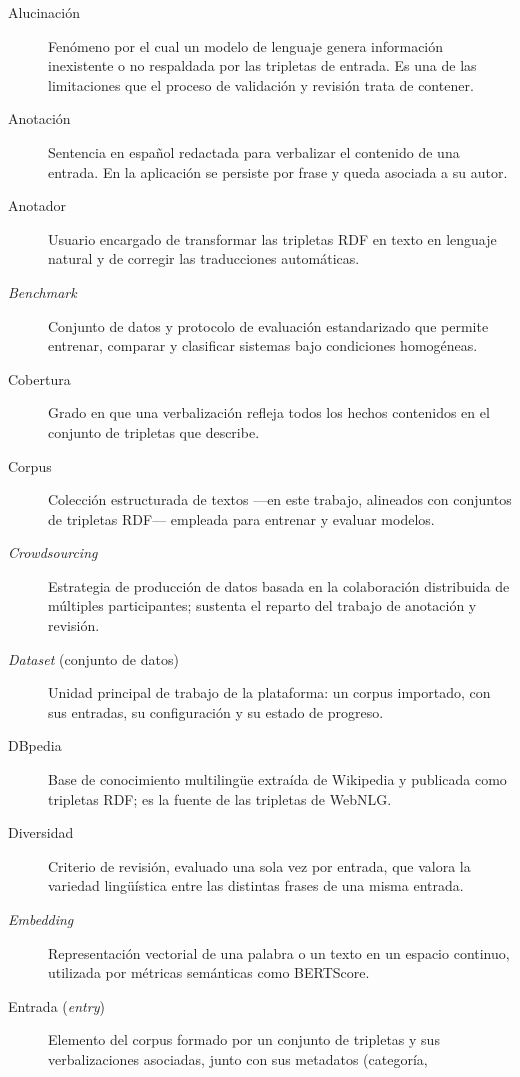 \begin{description}
	\item[Alucinación] Fenómeno por el cual un modelo de lenguaje genera información
	      inexistente o no respaldada por las tripletas de entrada. Es una de las
	      limitaciones que el proceso de validación y revisión trata de contener.
	\item[Anotación] Sentencia en español redactada para verbalizar el contenido de una
	      entrada. En la aplicación se persiste por frase y queda asociada a su autor.
	\item[Anotador] Usuario encargado de transformar las tripletas RDF en texto en
	      lenguaje natural y de corregir las traducciones automáticas.
	\item[\textit{Benchmark}] Conjunto de datos y protocolo de evaluación estandarizado
	      que permite entrenar, comparar y clasificar sistemas bajo condiciones
	      homogéneas.
	\item[Cobertura] Grado en que una verbalización refleja todos los hechos contenidos
	      en el conjunto de tripletas que describe.
	\item[Corpus] Colección estructurada de textos ---en este trabajo, alineados con
	      conjuntos de tripletas RDF--- empleada para entrenar y evaluar modelos.
	\item[\textit{Crowdsourcing}] Estrategia de producción de datos basada en la
	      colaboración distribuida de múltiples participantes; sustenta el reparto del
	      trabajo de anotación y revisión.
	\item[\textit{Dataset} (conjunto de datos)] Unidad principal de trabajo de la
	      plataforma: un corpus importado, con sus entradas, su configuración y su estado
	      de progreso.
	\item[DBpedia] Base de conocimiento multilingüe extraída de Wikipedia y publicada
	      como tripletas RDF; es la fuente de las tripletas de WebNLG.
	\item[Diversidad] Criterio de revisión, evaluado una sola vez por entrada, que valora
	      la variedad lingüística entre las distintas frases de una misma entrada.
	\item[\textit{Embedding}] Representación vectorial de una palabra o un texto en un
	      espacio continuo, utilizada por métricas semánticas como BERTScore.
	\item[Entrada (\textit{entry})] Elemento del corpus formado por un conjunto de
	      tripletas y sus verbalizaciones asociadas, junto con sus metadatos (categoría,

\end{description}
